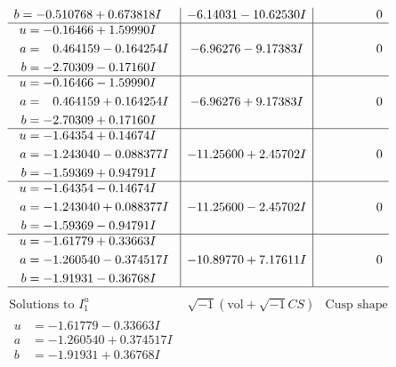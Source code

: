 \documentclass[1p]{elsarticle_modified}
\theoremstyle{definition}
\newcommand{\I}{\sqrt{-1}}
\begin{document}
$$\begin{array}{c|c|c}
\begin{aligned}
b &= -0.510768 + 0.673818 I\end{aligned}
 & -6.14031 - 10.62530 I & \phantom{-0.000000 } 0 \\ \hline\begin{aligned}
u &= -0.16466 + 1.59990 I \\
a &= \phantom{-}0.464159 - 0.164254 I \\
b &= -2.70309 - 0.17160 I\end{aligned}
 & -6.96276 - 9.17383 I & \phantom{-0.000000 } 0 \\ \hline\begin{aligned}
u &= -0.16466 - 1.59990 I \\
a &= \phantom{-}0.464159 + 0.164254 I \\
b &= -2.70309 + 0.17160 I\end{aligned}
 & -6.96276 + 9.17383 I & \phantom{-0.000000 } 0 \\ \hline\begin{aligned}
u &= -1.64354 + 0.14674 I \\
a &= -1.243040 - 0.088377 I \\
b &= -1.59369 + 0.94791 I\end{aligned}
 & -11.25600 + 2.45702 I & \phantom{-0.000000 } 0 \\ \hline\begin{aligned}
u &= -1.64354 - 0.14674 I \\
a &= -1.243040 + 0.088377 I \\
b &= -1.59369 - 0.94791 I\end{aligned}
 & -11.25600 - 2.45702 I & \phantom{-0.000000 } 0 \\ \hline\begin{aligned}
u &= -1.61779 + 0.33663 I \\
a &= -1.260540 - 0.374517 I \\
b &= -1.91931 - 0.36768 I\end{aligned}
 & -10.89770 + 7.17611 I & \phantom{-0.000000 } 0\\
 \hline 
 \end{array}$$\newpage$$\begin{array}{c|c|c}  
\text{Solutions to }I^u_{1}& \I (\text{vol} + \sqrt{-1}CS) & \text{Cusp shape}\\
 \hline 
\begin{aligned}
u &= -1.61779 - 0.33663 I \\
a &= -1.260540 + 0.374517 I \\
b &= -1.91931 + 0.36768 I\end{aligned}

\end{array}$$
\end{document}
